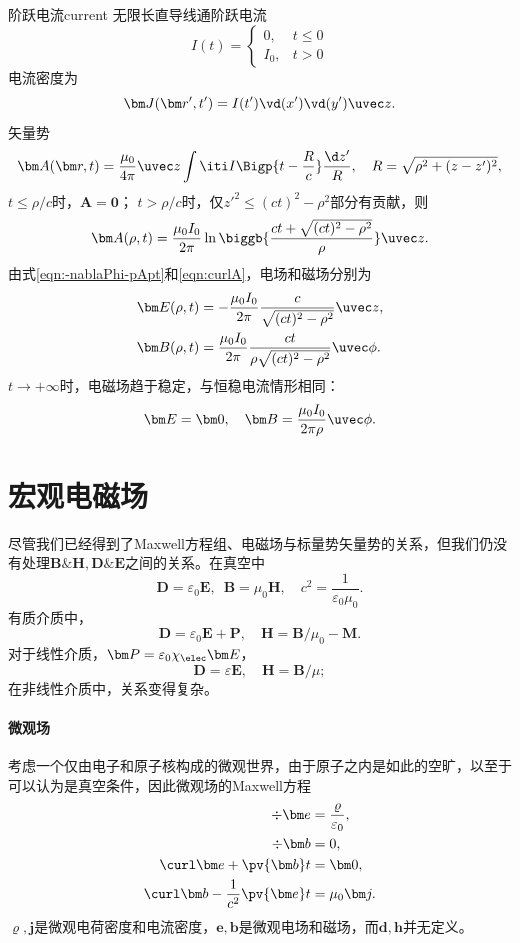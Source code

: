 \begin{example}{阶跃电流}{current}
    无限长直导线通阶跃电流
    \[
        I(t)=\begin{cases}
            0,&t\leqslant 0\\
            I_0,&t>0
        \end{cases}
    \]
    电流密度为
    \[
        \bm J(\bm r',t')=I(t')\vd(x')\vd(y')\uvec z.
    \]
    矢量势
    \[
        \bm A(\bm r,t)=\frac{\mu_0}{4\pi}\uvec z\int\iti I\Bigp{t-\frac Rc}\frac{\d z'}R,\quad R=\sqrt{\rho^2+(z-z')^2},
    \]
    $t\leqslant\rho/c$时，$\bm A=\bm 0$；
    $t>\rho/c$时，仅$z'^2\leqslant(ct)^2-\rho^2$部分有贡献，则
    \[
        \bm A(\rho,t)=\frac{\mu_0I_0}{2\pi}\ln\biggb{\frac{ct+\sqrt{(ct)^2-\rho^2}}{\rho}}\uvec z.
    \]
    由式\eqref{eqn:-nablaPhi-pApt}和\eqref{eqn:curlA}，电场和磁场分别为
    \begin{align*}
        \bm E(\rho,t)&=-\frac{\mu_0I_0}{2\pi}\frac c{\sqrt{(ct)^2-\rho^2}}\uvec z,\\
        \bm B(\rho,t)&=\frac{\mu_0I_0}{2\pi}\frac{ct}{\rho\sqrt{(ct)^2-\rho^2}}\uvec\phi.
    \end{align*}
    $t\to+\infty$时，电磁场趋于稳定，与恒稳电流情形相同：
    \[
        \bm E=\bm 0,\quad\bm B=\frac{\mu_0I_0}{2\pi\rho}\uvec\phi.
    \]
\end{example}
\section{宏观电磁场}
尽管我们已经得到了Maxwell方程组、电磁场与标量势矢量势的关系，但我们仍没有处理$\bm B\&\bm H,\bm D\&\bm E$之间的关系。在真空中
\[
    \bm D=\varepsilon_0\bm E,\enspace\bm B=\mu_0\bm H,\quad c^2=\frac1{\varepsilon_0\mu_0}.
\]
有质介质中，
\[
    \bm D=\varepsilon_0\bm E+\bm P,\quad \bm H=\bm B/\mu_0-\bm M.
\]
对于线性介质，$\bm P=\varepsilon_0\chi_\elec\bm E$，
\[
    \bm D=\varepsilon\bm E,\quad\bm H=\bm B/\mu;
\]
在非线性介质中，关系变得复杂。
\paragraph{微观场}
考虑一个仅由电子和原子核构成的微观世界，由于原子之内是如此的空旷，以至于可以认为是真空条件，因此微观场的Maxwell方程
\begin{align*}
    \div\bm e&=\frac\varrho{\varepsilon_0},\\
    \div\bm b&=0,\\
    \curl\bm e+\pv{\bm b}t&=\bm 0,\\
    \curl\bm b-\frac1{c^2}\pv{\bm e}t&=\mu_0\bm j.
\end{align*}
$\varrho,\bm j$是微观电荷密度和电流密度，$\bm e,\bm b$是微观电场和磁场，而$\bm d,\bm h$并无定义。

